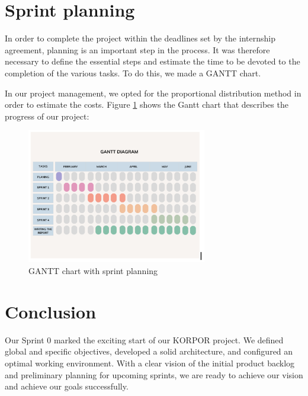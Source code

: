 \section{Sprint planning}

In order to complete the project within the deadlines set by the internship agreement, planning is an important step in the process. It was therefore necessary to define the essential steps and estimate the time to be devoted to the completion of the various tasks. To do this, we made a GANTT chart.

In our project management, we opted for the proportional distribution method in order to estimate the costs.
Figure \ref{fig:gantt-chart} shows the Gantt chart that describes the progress of our project:

\vspace{1cm}

\begin{figure}[htbp]
    \centering
    \includegraphics[width=0.7\textwidth]{images/gantt-chart.png}
    \caption{GANTT chart with sprint planning}
    \label{fig:gantt-chart}
\end{figure}


\section{Conclusion}

Our Sprint 0 marked the exciting start of our KORPOR project. We defined global and specific objectives, developed a solid architecture, and configured an optimal working environment. With a clear vision of the initial product backlog and preliminary planning for upcoming sprints, we are ready to achieve our vision and achieve our goals successfully.